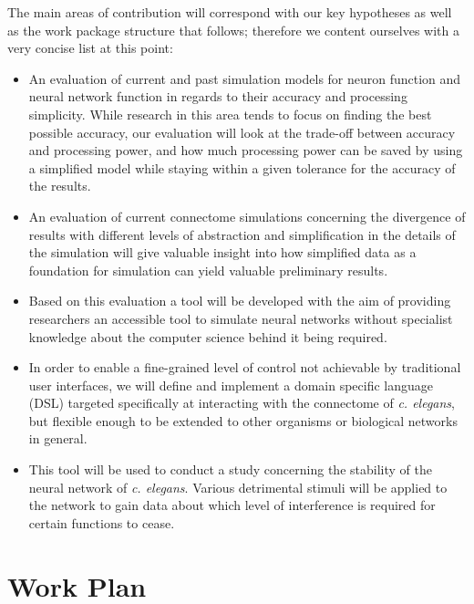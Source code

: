 \documentclass[a4paper,11pt]{article}
\begin{document}
The main areas of contribution will correspond with our key hypotheses as well as the work package structure that follows; therefore we content ourselves with a very concise list at this point:
\begin{itemize} 
  \item An evaluation of current and past simulation models for neuron function and neural network function in regards to their accuracy and processing simplicity. While research in this area tends to focus on finding the best possible accuracy, our evaluation will look at the trade-off between accuracy and processing power, and how much processing power can be saved by using a simplified model while staying within a given tolerance for the accuracy of the results.
  \item An evaluation of current connectome simulations concerning the divergence of results with different levels of abstraction and simplification in the details of the simulation will give valuable insight into how simplified data as a foundation for simulation can yield valuable preliminary results.
  \item Based on this evaluation a tool will be developed with the aim of providing researchers an accessible tool to simulate neural networks without specialist knowledge about the computer science behind it being required.
  \item In order to enable a fine-grained level of control not achievable by traditional user interfaces, we will define and implement a domain specific language (DSL) targeted specifically at interacting with the connectome of \emph{c. elegans}, but flexible enough to be extended to other organisms or biological networks in general.
  \item This tool will be used to conduct a study concerning the stability of the neural network of \emph{c. elegans}. Various detrimental stimuli will be applied to the network to gain data about which level of interference is required for certain functions to cease.
\end{itemize}





\section{Work Plan}
\end{document}
